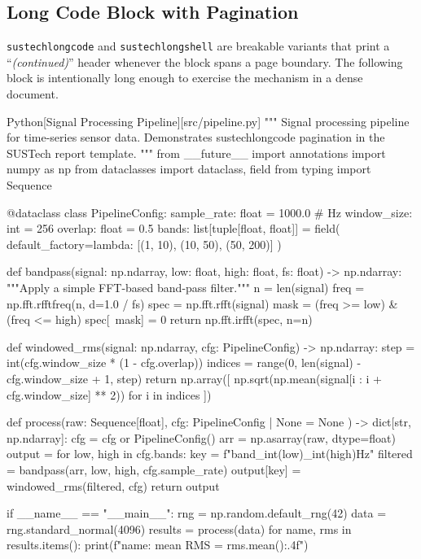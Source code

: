 \documentclass[titlepage=formal,logo=assets/校徽+中英文校名-上下.pdf,code=listings]{SUSTechHomework}
\begin{document}
\subsection{Long Code Block with Pagination}

\texttt{sustechlongcode} and \texttt{sustechlongshell} are breakable variants
that print a ``\textit{(continued)}'' header whenever the block spans a page
boundary.  The following block is intentionally long enough to exercise the
mechanism in a dense document.

\begin{sustechlongcode}{Python}[Signal Processing Pipeline][src/pipeline.py]
"""
Signal processing pipeline for time-series sensor data.
Demonstrates sustechlongcode pagination in the SUSTech report template.
"""
from __future__ import annotations
import numpy as np
from dataclasses import dataclass, field
from typing import Sequence

@dataclass
class PipelineConfig:
    sample_rate: float = 1000.0          # Hz
    window_size: int   = 256
    overlap:     float = 0.5
    bands: list[tuple[float, float]] = field(
        default_factory=lambda: [(1, 10), (10, 50), (50, 200)]
    )

def bandpass(signal: np.ndarray, low: float, high: float,
             fs: float) -> np.ndarray:
    """Apply a simple FFT-based band-pass filter."""
    n    = len(signal)
    freq = np.fft.rfftfreq(n, d=1.0 / fs)
    spec = np.fft.rfft(signal)
    mask = (freq >= low) & (freq <= high)
    spec[~mask] = 0
    return np.fft.irfft(spec, n=n)

def windowed_rms(signal: np.ndarray, cfg: PipelineConfig) -> np.ndarray:
    step    = int(cfg.window_size * (1 - cfg.overlap))
    indices = range(0, len(signal) - cfg.window_size + 1, step)
    return np.array([
        np.sqrt(np.mean(signal[i : i + cfg.window_size] ** 2))
        for i in indices
    ])

def process(raw: Sequence[float], cfg: PipelineConfig | None = None
            ) -> dict[str, np.ndarray]:
    cfg    = cfg or PipelineConfig()
    arr    = np.asarray(raw, dtype=float)
    output = {}
    for low, high in cfg.bands:
        key         = f"band_{int(low)}_{int(high)}Hz"
        filtered    = bandpass(arr, low, high, cfg.sample_rate)
        output[key] = windowed_rms(filtered, cfg)
    return output

if __name__ == "__main__":
    rng  = np.random.default_rng(42)
    data = rng.standard_normal(4096)
    results = process(data)
    for name, rms in results.items():
        print(f"{name}: mean RMS = {rms.mean():.4f}")
\end{sustechlongcode}
\end{document}
